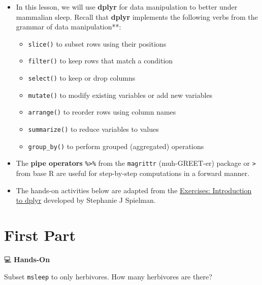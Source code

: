 \documentclass[
  letterpaper,
  DIV=11,
  numbers=noendperiod]{scrreprt}
\providecommand{\tightlist}{%
  \setlength{\itemsep}{0pt}\setlength{\parskip}{0pt}}\usepackage{longtable,booktabs,array}
\begin{document}
\begin{itemize}
\item
  In this lesson, we will use \textbf{dplyr} for data manipulation to
  better under mammalian sleep. Recall that \textbf{dplyr} implements
  the following verbs from the grammar of data manipulation**:

  \begin{itemize}
  \tightlist
  \item
    \texttt{slice()} to subset rows using their positions
  \item
    \texttt{filter()} to keep rows that match a condition
  \item
    \texttt{select()} to keep or drop columns
  \item
    \texttt{mutate()} to modify existing variables or add new variables
  \item
    \texttt{arrange()} to reorder rows using column names
  \item
    \texttt{summarize()} to reduce variables to values
  \item
    \texttt{group\_by()} to perform grouped (aggregated) operations
  \end{itemize}
\item
  The \textbf{pipe operators} \texttt{\%\textgreater{}\%} from the
  \texttt{magrittr} (muh-GREET-er) package or
  \texttt{\textbar{}\textgreater{}} from base R are useful for
  step-by-step computations in a forward manner.
\item
  The hands-on activities below are adapted from the
  \href{https://sjspielman.github.io/datascience_for_biologists/exercises/dplyr.html}{Exercises:
  Introduction to dplyr} developed by Stephanie J Spielman.
\end{itemize}

\section{First Part}\label{first-part}

💻 \textbf{Hands-On}

Subset \texttt{msleep} to only herbivores. How many herbivores are
there?
\end{document}

